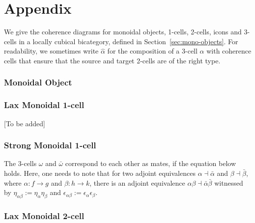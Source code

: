 \section{Appendix}
\label{ap:coherence}

We give the coherence diagrams for  monoidal objects, 1-cells, 2-cells, icons and 3-cells in a locally cubical bicategory, defined in Section~\ref{sec:mono-objects}. For readability, we sometimes write $\hat{\alpha}$ for the composition of a 3-cell ${\alpha}$ with coherence cells that ensure that the source and target 2-cells are of the right type.

\subsubsection*{Monoidal Object}

 \newpage
 \newpage



\subsubsection*{Lax Monoidal 1-cell}
[To be added]

\subsubsection*{Strong Monoidal 1-cell}

%

The 3-cells $\omega$ and $\bar{\omega}$ correspond to each other as mates, if the equation below holds. Here, one needs to note that for two adjoint equivalences $\alpha \dashv \bar{\alpha}$ and $\beta \dashv \bar{\beta}$, where $\alpha: f \rightarrow g$ and $\beta: h \rightarrow k$, there is an adjoint equivalence $\alpha \beta \dashv \bar{\alpha}\bar{\beta}$ witnessed by $\eta_{\alpha \beta} := \eta_{\alpha} \eta_{\beta}$ and $\epsilon_{\alpha \beta} :=  \epsilon_{\alpha} \epsilon_{\beta}$.  %

%

%

%


\subsubsection*{Lax Monoidal 2-cell}

